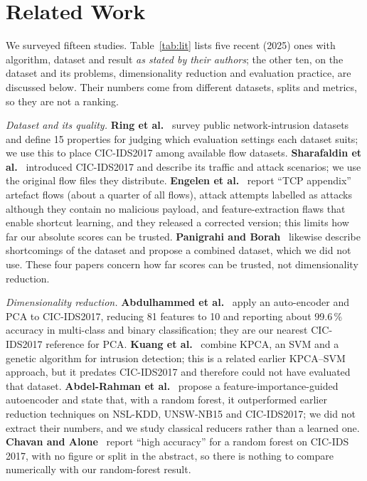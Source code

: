\documentclass[runningheads]{llncs}
\begin{document}
\section{Related Work}
We surveyed fifteen studies. Table~\ref{tab:lit} lists five recent (2025) ones with algorithm, dataset and result \emph{as stated by their authors}; the other ten, on the dataset and its problems, dimensionality reduction and evaluation practice, are discussed below. Their numbers come from different datasets, splits and metrics, so they are not a ranking.


\textit{Dataset and its quality.} \textbf{Ring et al.}~\cite{ring2019} survey public network-intrusion datasets and define 15 properties for judging which evaluation settings each dataset suits; we use this to place CIC-IDS2017 among available flow datasets. \textbf{Sharafaldin et al.}~\cite{sharafaldin2018} introduced CIC-IDS2017 and describe its traffic and attack scenarios; we use the original flow files they distribute. \textbf{Engelen et al.}~\cite{engelen2021} report ``TCP appendix'' artefact flows (about a quarter of all flows), attack attempts labelled as attacks although they contain no malicious payload, and feature-extraction flaws that enable shortcut learning, and they released a corrected version; this limits how far our absolute scores can be trusted. \textbf{Panigrahi and Borah}~\cite{panigrahi2018} likewise describe shortcomings of the dataset and propose a combined dataset, which we did not use. These four papers concern how far scores can be trusted, not dimensionality reduction.

\textit{Dimensionality reduction.} \textbf{Abdulhammed et al.}~\cite{abdulhammed2019} apply an auto-encoder and PCA to CIC-IDS2017, reducing 81 features to 10 and reporting about 99.6\,\% accuracy in multi-class and binary classification; they are our nearest CIC-IDS2017 reference for PCA. \textbf{Kuang et al.}~\cite{kuang2014} combine KPCA, an SVM and a genetic algorithm for intrusion detection; this is a related earlier KPCA--SVM approach, but it predates CIC-IDS2017 and therefore could not have evaluated that dataset. \textbf{Abdel-Rahman et al.}~\cite{abdelrahman2026} propose a feature-importance-guided autoencoder and state that, with a random forest, it outperformed earlier reduction techniques on NSL-KDD, UNSW-NB15 and CIC-IDS2017; we did not extract their numbers, and we study classical reducers rather than a learned one. \textbf{Chavan and Alone}~\cite{chavan2025} report ``high accuracy'' for a random forest on CIC-IDS 2017, with no figure or split in the abstract, so there is nothing to compare numerically with our random-forest result.
\end{document}

